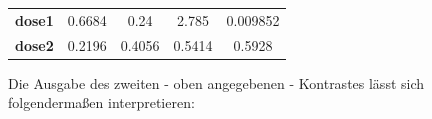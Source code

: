 \documentclass[]{article}
\begin{document}
\begin{longtable}[]{@{}ccccc@{}}
\begin{minipage}[t]{0.24\columnwidth}\centering\strut
\textbf{dose1}\strut
\end{minipage} & \begin{minipage}[t]{0.13\columnwidth}\centering\strut
0.6684\strut
\end{minipage} & \begin{minipage}[t]{0.16\columnwidth}\centering\strut
0.24\strut
\end{minipage} & \begin{minipage}[t]{0.12\columnwidth}\centering\strut
2.785\strut
\end{minipage} & \begin{minipage}[t]{0.13\columnwidth}\centering\strut
0.009852\strut
\end{minipage}\tabularnewline
\begin{minipage}[t]{0.24\columnwidth}\centering\strut
\textbf{dose2}\strut
\end{minipage} & \begin{minipage}[t]{0.13\columnwidth}\centering\strut
0.2196\strut
\end{minipage} & \begin{minipage}[t]{0.16\columnwidth}\centering\strut
0.4056\strut
\end{minipage} & \begin{minipage}[t]{0.12\columnwidth}\centering\strut
0.5414\strut
\end{minipage} & \begin{minipage}[t]{0.13\columnwidth}\centering\strut
0.5928\strut
\end{minipage}\tabularnewline
\bottomrule
\end{longtable}

Die Ausgabe des zweiten - oben angegebenen - Kontrastes lässt sich
folgendermaßen interpretieren:
\end{document}
